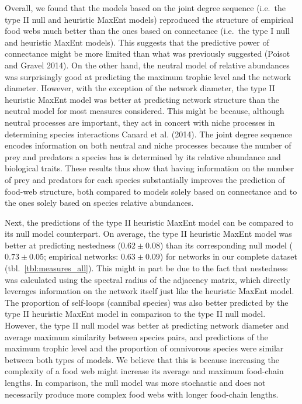 \documentclass[11pt]{article}
\begin{document}
Overall, we found that the models based on the joint degree sequence
(i.e.~the type II null and heuristic MaxEnt models) reproduced the
structure of empirical food webs much better than the ones based on
connectance (i.e.~the type I null and heuristic MaxEnt models). This
suggests that the predictive power of connectance might be more limited
than what was previously suggested (Poisot and Gravel 2014). On the
other hand, the neutral model of relative abundances was surprisingly
good at predicting the maximum trophic level and the network diameter.
However, with the exception of the network diameter, the type II
heuristic MaxEnt model was better at predicting network structure than
the neutral model for most measures considered. This might be because,
although neutral processes are important, they act in concert with niche
processes in determining species interactions Canard et al. (2014). The
joint degree sequence encodes information on both neutral and niche
processes because the number of prey and predators a species has is
determined by its relative abundance and biological traits. These
results thus show that having information on the number of prey and
predators for each species substantially improves the prediction of
food-web structure, both compared to models solely based on connectance
and to the ones solely based on species relative abundances.

Next, the predictions of the type II heuristic MaxEnt model can be
compared to its null model counterpart. On average, the type II
heuristic MaxEnt model was better at predicting nestedness
(\(0.62 \pm 0.08\)) than its corresponding null model
(\(0.73 \pm 0.05\); empirical networks: \(0.63 \pm 0.09\)) for networks
in our complete dataset (tbl.~\ref{tbl:measures_all}). This might in
part be due to the fact that nestedness was calculated using the
spectral radius of the adjacency matrix, which directly leverages
information on the network itself just like the heuristic MaxEnt model.
The proportion of self-loops (cannibal species) was also better
predicted by the type II heuristic MaxEnt model in comparison to the
type II null model. However, the type II null model was better at
predicting network diameter and average maximum similarity between
species pairs, and predictions of the maximum trophic level and the
proportion of omnivorous species were similar between both types of
models. We believe that this is because increasing the complexity of a
food web might increase its average and maximum food-chain lengths. In
comparison, the null model was more stochastic and does not necessarily
produce more complex food webs with longer food-chain lengths.
\end{document}
